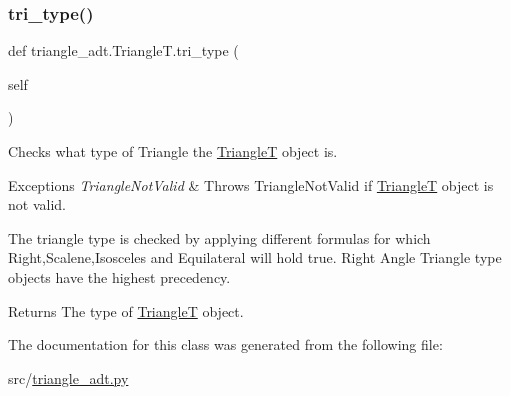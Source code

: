 \subsubsection{\texorpdfstring{tri\+\_\+type()}{tri\_type()}}
{\footnotesize\ttfamily def triangle\+\_\+adt.\+Triangle\+T.\+tri\+\_\+type (\begin{DoxyParamCaption}\item[{}]{self }\end{DoxyParamCaption})}



Checks what type of Triangle the \hyperlink{classtriangle__adt_1_1_triangle_t}{TriangleT} object is. 


\begin{DoxyExceptions}{Exceptions}
{\em Triangle\+Not\+Valid} & Throws Triangle\+Not\+Valid if \hyperlink{classtriangle__adt_1_1_triangle_t}{TriangleT} object is not valid.\\
\hline
\end{DoxyExceptions}
The triangle type is checked by applying different formulas for which Right,Scalene,Isosceles and Equilateral will hold true. Right Angle Triangle type objects have the highest precedency. \begin{DoxyReturn}{Returns}
The type of \hyperlink{classtriangle__adt_1_1_triangle_t}{TriangleT} object. 
\end{DoxyReturn}


The documentation for this class was generated from the following file\+:\begin{DoxyCompactItemize}
\item 
src/\hyperlink{triangle__adt_8py}{triangle\+\_\+adt.\+py}\end{DoxyCompactItemize}
